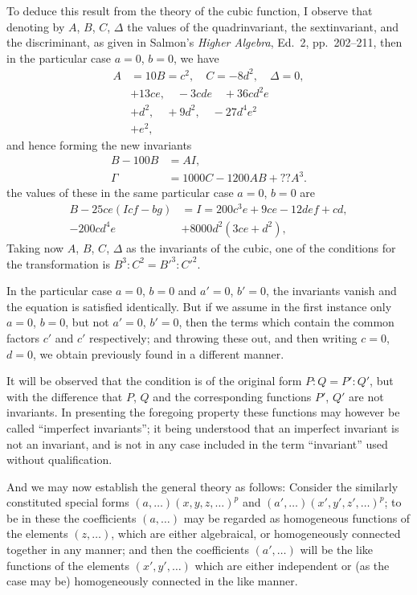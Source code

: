 \documentclass[11pt,a4paper]{book}
\begin{document}
\noindent
To deduce this result from the theory of the cubic function, I observe that
denoting by $A$, $B$, $C$, $\Delta$ the values of the quadrinvariant, the sextinvariant, and the
discriminant, as given in Salmon's \textit{Higher Algebra}, Ed.\ 2, pp.\ 202--211, then in the
particular case $a = 0$, $b = 0$, we have
\begin{align*}
A &= 10 B = c^2, \quad C = -8 d^2, \quad \Delta = 0, \\
&+ 13 ce, \quad -3 cd e \quad + 36 cd^2 e \\
&+ d^2, \quad + 9 d^2, \quad - 27 d^4 e^2 \\
&+ e^2,
\end{align*}
and hence forming the new invariants
\begin{align*}
B - 100 B &= A I, \\
\Gamma &= 1000 C - 1200 A B + ?? A^3.
\end{align*}
the values of these in the same particular case $a = 0$, $b = 0$ are
\begin{align*}
B - 25 ce(I cf - bg) &= I = 200 c^3 e + 9 ce - 12 d ef + cd, \\
- 200 cd^4 e &+ 8000 d^2 (3 ce + d^2),
\end{align*}
Taking now $A$, $B$, $C$, $\Delta$ as the invariants of the cubic, one of the conditions for the
transformation is $B^3 : C^2 = B'^3 : C'^2$.

In the particular case $a = 0$, $b = 0$ and $a' = 0$, $b' = 0$, the invariants vanish and
the equation is satisfied identically.  But if we assume in the first instance only
$a = 0$, $b = 0$, but not $a' = 0$, $b' = 0$, then the terms which contain the common factors $c'$ and $c'$ respectively;
and throwing these out, and then writing $c = 0$, $d = 0$, we obtain
previously found in a different manner.

It will be observed that the condition is of the original form $P : Q = P' : Q'$,
but with the difference that $P$, $Q$ and the corresponding functions $P'$, $Q'$ are not
invariants. In presenting the foregoing property these functions may however be called
``imperfect invariants''; it being understood that an imperfect invariant is not an
invariant, and is not in any case included in the term ``invariant'' used without
qualification.

And we may now establish the general theory as follows: Consider the similarly
constituted special forms $(a, \ldots)(x, y, z, \ldots)^p$ and $(a', \ldots)(x', y', z', \ldots)^p$; to be in these
the coefficients $(a, \ldots)$ may be regarded as homogeneous functions of the elements
$(z, \ldots)$, which are either algebraical, or homogeneously connected together in any
manner; and then the coefficients $(a', \ldots)$ will be the like functions of the elements
$(x', y', \ldots)$ which are either independent or (as the case may be) homogeneously connected
in the like manner.
\end{document}
